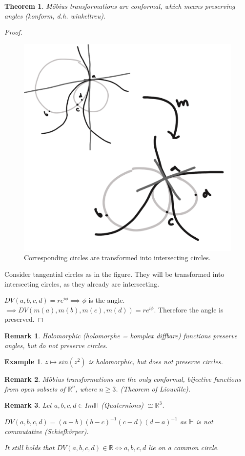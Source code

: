 \documentclass[]{article}
\newtheorem{theorem}{Theorem}
\newtheorem{example}{Example}
\newtheorem{remark}{Remark}
\begin{document}
\begin{theorem}
	Möbius transformations are conformal, which means preserving angles (konform, d.h. winkeltreu).
\end{theorem}

\begin{proof}
	
	\begin{figure}[h!]
		\centering
		\includegraphics[width=0.3\linewidth]{figures/moebius_angle_conserving}
		\caption{Corresponding circles are transformed into intersecting circles.}
		\label{fig:moebius_angle_conserving}
	\end{figure}
	
	Consider tangential circles as in the figure. They will be transformed into intersecting circles, as they already are intersecting.
	
	$DV(a,b,c,d) = r e^{i\phi} \implies \phi$ is the angle. $\implies DV(m(a), m(b), m(c), m(d)) = r e^{i\phi}$. Therefore the angle is preserved. 
	
\end{proof}

\begin{remark}
	Holomorphic (holomorphe = komplex diffbare) functions preserve angles, but do not preserve circles.
\end{remark}

\begin{example}
	$z \mapsto sin(z^2)$ is holomorphic, but does not preserve circles.
\end{example}

\begin{remark}
	Möbius transformations are the only conformal, bijective functions from open subsets of $\mathbb{R}^n$, where $n \geq 3$. (Theorem of Liouville).
\end{remark}

\begin{remark}
	Let $a,b,c,d \in Im \mathbb{H}$ (Quaternions) $\cong \mathbb{R}^3$.
	
	$DV(a,b,c,d) = (a-b) (b-c)^{-1} (c-d) (d-a)^{-1}$ as $\mathbb{H}$ is not commutative (Schiefkörper).
	
	It still holds that $DV(a,b,c,d) \in \mathbb{R} \iff a,b,c,d$ lie on a common circle.
\end{remark}
\end{document}
